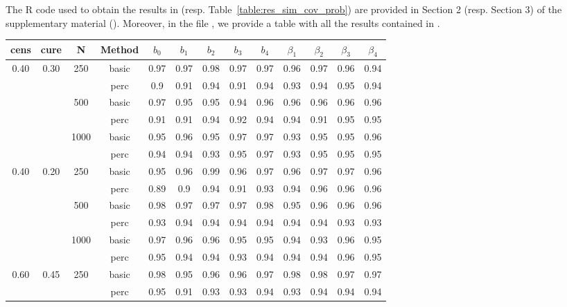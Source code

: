 The R code used to obtain the results in  (resp. Table~\ref{table:res_sim_cov_prob}) are provided in Section 2 (resp. Section 3) of the supplementary material (). Moreover, in the file , we provide a table with all the results contained in .



 \FloatBarrier

{\footnotesize
\begin{longtable}{cccc|ccccc|cccc}
\toprule
cens  & cure  & N & Method  & $b_0$ & $b_1$ & $b_2$ & $b_3$ & $b_4$ & $\beta_1$ & $\beta_2$ & $\beta_3$ & $\beta_4$ \\
\midrule
0.40 & 0.30 & 250 & basic & 0.97 & 0.97 & 0.98 & 0.97 & 0.97 & 0.96 & 0.97 & 0.96 & 0.94 \\ 
   &  &  & perc & 0.9 & 0.91 & 0.94 & 0.91 & 0.94 & 0.93 & 0.94 & 0.95 & 0.94 \\ 
   &  & 500 & basic & 0.97 & 0.95 & 0.95 & 0.94 & 0.96 & 0.96 & 0.96 & 0.96 & 0.96 \\ 
   &  &  & perc & 0.91 & 0.91 & 0.94 & 0.92 & 0.94 & 0.94 & 0.91 & 0.95 & 0.95 \\ 
   &  & 1000 & basic & 0.95 & 0.96 & 0.95 & 0.97 & 0.97 & 0.93 & 0.95 & 0.95 & 0.96 \\ 
   &  &  & perc & 0.94 & 0.94 & 0.93 & 0.95 & 0.97 & 0.93 & 0.95 & 0.95 & 0.95 \\ 
\midrule
  0.40 & 0.20 & 250 & basic & 0.95 & 0.96 & 0.99 & 0.96 & 0.97 & 0.96 & 0.97 & 0.97 & 0.96 \\ 
   &  &  & perc & 0.89 & 0.9 & 0.94 & 0.91 & 0.93 & 0.94 & 0.96 & 0.96 & 0.96 \\ 
   &  & 500 & basic & 0.98 & 0.97 & 0.97 & 0.97 & 0.98 & 0.95 & 0.96 & 0.96 & 0.96 \\ 
   &  &  & perc & 0.93 & 0.94 & 0.94 & 0.94 & 0.94 & 0.94 & 0.94 & 0.93 & 0.93 \\ 
   &  & 1000 & basic & 0.97 & 0.96 & 0.96 & 0.95 & 0.95 & 0.94 & 0.93 & 0.96 & 0.95 \\ 
   &  &  & perc & 0.95 & 0.94 & 0.94 & 0.93 & 0.94 & 0.94 & 0.94 & 0.96 & 0.95 \\ 
\midrule
  0.60 & 0.45 & 250 & basic & 0.98 & 0.95 & 0.96 & 0.96 & 0.97 & 0.98 & 0.98 & 0.97 & 0.97 \\ 
   &  &  & perc & 0.95 & 0.91 & 0.93 & 0.93 & 0.94 & 0.93 & 0.94 & 0.94 & 0.94 \\ 

\end{longtable}}
